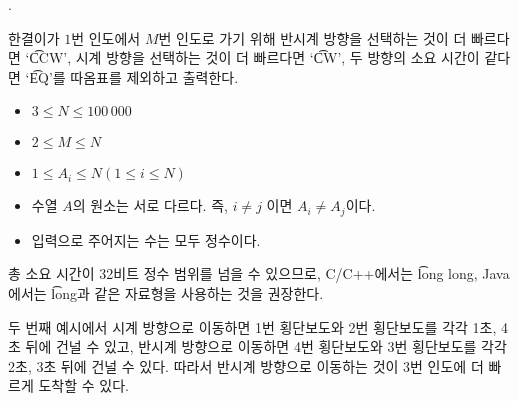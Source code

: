 \begin{problem}{\probno{}. \probtitle{}}
\OutputFile

한결이가 $1$번 인도에서 $M$번 인도로 가기 위해 반시계 방향을 선택하는 것이 더 빠르다면 `\t{CCW}', 시계 방향을 선택하는 것이 더 빠르다면 `\t{CW}', 두 방향의 소요 시간이 같다면 `\t{EQ}'를 따옴표를 제외하고 출력한다.

\Constraints

\begin{itemize}[topsep=0pt,noitemsep]
    \item $3 \le N \le 100\,000$
    \item $2 \le M \le N$
    \item $1 \le A_i \le N (1 \le i \le N)$
    \item 수열 $A$의 원소는 서로 다르다. 즉, $i \ne j$ 이면 $A_i \ne A_j$이다.
    \item 입력으로 주어지는 수는 모두 정수이다.
\end{itemize}

\Example

\begin{example}
\end{example}

\Notes
총 소요 시간이 32비트 정수 범위를 넘을 수 있으므로, C/C++에서는 \t{long long}, Java에서는 \t{long}과 같은 자료형을 사용하는 것을 권장한다.


두 번째 예시에서 시계 방향으로 이동하면 1번 횡단보도와 2번 횡단보도를 각각 1초, 4초 뒤에 건널 수 있고, 반시계 방향으로 이동하면 4번 횡단보도와 3번 횡단보도를 각각 2초, 3초 뒤에 건널 수 있다. 따라서 반시계 방향으로 이동하는 것이 3번 인도에 더 빠르게 도착할 수 있다.

\end{problem}
